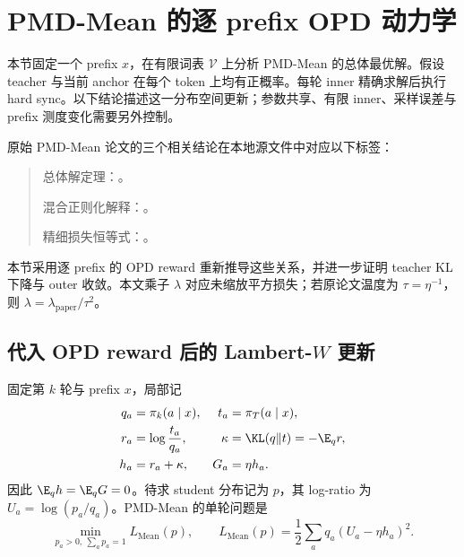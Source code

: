\section{PMD-Mean 的逐 prefix OPD 动力学}
\label{sec:mean-prefix-analysis}

本节固定一个 prefix $x$，在有限词表 $\mathcal V$ 上分析 PMD-Mean 的总体最优解。假设 teacher 与当前 anchor 在每个 token 上均有正概率。每轮 inner 精确求解后执行 hard sync。以下结论描述这一分布空间更新；参数共享、有限 inner、采样误差与 prefix 测度变化需要另外控制。

原始 PMD-Mean 论文的三个相关结论在本地源文件中对应以下标签：
\begin{quote}
总体解定理：。\par
混合正则化解释：。\par
精细损失恒等式：。
\end{quote}
本节采用逐 prefix 的 OPD reward 重新推导这些关系，并进一步证明 teacher KL 下降与 outer 收敛。本文乘子 $\lambda$ 对应未缩放平方损失；若原论文温度为 $\tau=\eta^{-1}$，则 $\lambda=\lambda_{\mathrm{paper}}/\tau^2$。

\subsection{代入 OPD reward 后的 Lambert-$W$ 更新}

固定第 $k$ 轮与 prefix $x$，局部记
\begin{align}
 q_a&=\pi_k(a\mid x), & t_a&=\pi_T(a\mid x),\notag\\
 r_a&=\log\frac{t_a}{q_a}, &
 \kappa&=\KL(q\Vert t)=-\E_q r,\notag\\
 h_a&=r_a+\kappa, & G_a&=\eta h_a.
 \label{eq:mean-local-opd-definitions}
\end{align}
因此 $\E_qh=\E_qG=0$。待求 student 分布记为 $p$，其 log-ratio 为 $U_a=\log(p_a/q_a)$。PMD-Mean 的单轮问题是
\begin{equation}
 \min_{p_a>0,\ \sum_a p_a=1}
 L_{\mathrm{Mean}}(p),
 \qquad
 L_{\mathrm{Mean}}(p)=\frac12\sum_aq_a(U_a-\eta h_a)^2.
 \label{eq:mean-opd-local-problem}
\end{equation}

